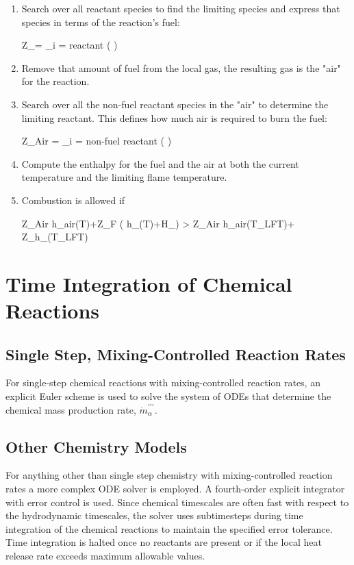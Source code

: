 \begin{enumerate}
\item Search over all reactant species to find the limiting species and express that species in terms of the reaction's fuel:

\be \Delta Z_\F = \min_{i \; = \; reactant} \left( \right) \ee
\item Remove that amount of fuel from the local gas, the resulting gas is the "air" for the reaction.
\item Search over all the non-fuel reactant species in the "air" to determine the limiting reactant.  This defines how much air is required to burn the fuel:

\be \Delta Z_{Air} = \min_{i \; = \; non-fuel \; reactant} \left( \right) \ee

\item Compute the enthalpy for the fuel and the air at both the current temperature and the limiting flame temperature.
\item Combustion is allowed if 

\be \Delta Z_{Air} h_{air}(T)+\Delta Z_F \left( h_\F(T)+\Delta H_\F \right) > \Delta Z_{Air} h_{air}(T_{LFT})+ \Delta Z_\F h_\F(T_{LFT}) \ee

\end{enumerate}

\section{Time Integration of Chemical Reactions}

\subsection{Single Step, Mixing-Controlled Reaction Rates}
For single-step chemical reactions with mixing-controlled reaction rates, an explicit Euler scheme is used to solve the system of ODEs that determine the chemical mass production rate, $\dot{m}^{\prime\prime\prime}_{\alpha}$.   


\subsection{Other Chemistry Models}

For anything other than single step chemistry with mixing-controlled reaction rates a more complex ODE solver is employed.  A fourth-order explicit integrator with error control is used.  Since chemical timescales are often fast with respect to the hydrodynamic timescales, the solver uses subtimesteps during time integration of the chemical reactions to maintain the specified error tolerance.  Time integration is halted once no reactants are present or if the local heat release rate exceeds maximum allowable values.

